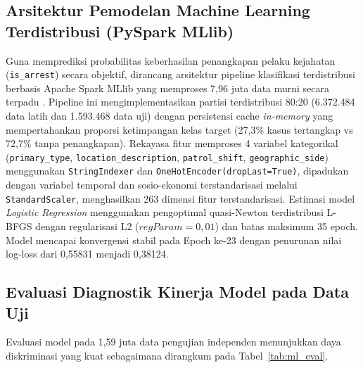 \documentclass[11pt,a4paper]{article}
\begin{document}
\subsection{Arsitektur Pemodelan Machine Learning Terdistribusi (PySpark MLlib)}
Guna memprediksi probabilitas keberhasilan penangkapan pelaku kejahatan (\texttt{is\_arrest}) secara objektif, dirancang arsitektur pipeline klasifikasi terdistribusi berbasis Apache Spark MLlib yang memproses 7,96 juta data murni secara terpadu \cite{djon2023, mandalapu2023}. Pipeline ini mengimplementasikan partisi terdistribusi 80:20 (6.372.484 data latih dan 1.593.468 data uji) dengan persistensi cache \textit{in-memory} yang mempertahankan proporsi ketimpangan kelas target (27,3\% kasus tertangkap vs 72,7\% tanpa penangkapan). Rekayasa fitur memproses 4 variabel kategorikal (\texttt{primary\_type}, \texttt{location\_description}, \texttt{patrol\_shift}, \texttt{geographic\_side}) menggunakan \texttt{StringIndexer} dan \texttt{OneHotEncoder(dropLast=True)}, dipadukan dengan variabel temporal dan sosio-ekonomi terstandarisasi melalui \texttt{StandardScaler}, menghasilkan 263 dimensi fitur terstandarisasi. Estimasi model \textit{Logistic Regression} menggunakan pengoptimal quasi-Newton terdistribusi L-BFGS dengan regularisasi L2 ($regParam = 0,01$) dan batas maksimum 35 epoch. Model mencapai konvergensi stabil pada Epoch ke-23 dengan penurunan nilai log-loss dari 0,55831 menjadi 0,38124.

\subsection{Evaluasi Diagnostik Kinerja Model pada Data Uji}
Evaluasi model pada 1,59 juta data pengujian independen menunjukkan daya diskriminasi yang kuat sebagaimana dirangkum pada Tabel~\ref{tab:ml_eval}.
\end{document}
